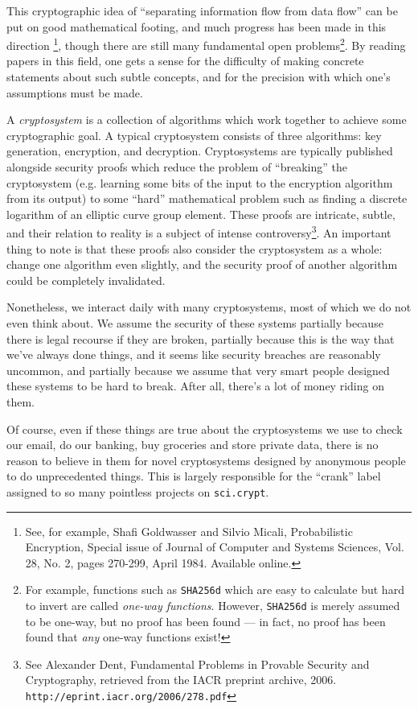 \documentclass[letterpaper]{article}
\begin{document}
This cryptographic idea of ``separating information flow from data flow''
can be put on good mathematical footing, and much progress has been made
in this direction \footnote{See, for example, Shafi Goldwasser and Silvio
Micali, Probabilistic Encryption, Special issue of Journal of Computer and
Systems Sciences, Vol. 28, No. 2, pages 270-299, April 1984. Available online.},
though there are still many fundamental open problems\footnote{For example,
functions such as \texttt{SHA256d} which are easy to calculate but hard to
invert are called \emph{one-way functions}. However, \texttt{SHA256d} is
merely assumed to be one-way, but no proof has been found --- in fact, no
proof has been found that \emph{any} one-way functions exist!}. By reading
papers in this field, one gets a sense for the difficulty of making
concrete statements about such subtle concepts, and for the precision
with which one's assumptions must be made.

A \emph{cryptosystem} is a collection of algorithms which work together
to achieve some cryptographic goal. A typical cryptosystem consists of
three algorithms: key generation, encryption, and decryption. Cryptosystems
are typically published alongside security proofs which reduce the problem
of ``breaking'' the cryptosystem (e.g. learning some bits of the input to
the encryption algorithm from its output) to some ``hard'' mathematical
problem such as finding a discrete logarithm of an elliptic curve group
element. These proofs are intricate, subtle, and their relation to reality
is a subject of intense controversy\footnote{See Alexander Dent, Fundamental
Problems in Provable Security and Cryptography, retrieved from the IACR
preprint archive, 2006. \texttt{http://eprint.iacr.org/2006/278.pdf}}. An
important thing to note is that these proofs also consider the cryptosystem
as a whole: change one algorithm even slightly, and the security proof of
another algorithm could be completely invalidated.

Nonetheless, we interact daily with many cryptosystems, most of which we
do not even think about. We assume the security of these systems partially
because there is legal recourse if they are broken, partially because this
is the way that we've always done things, and it seems like security breaches
are reasonably uncommon, and partially because we assume that very smart people
designed these systems to be hard to break. After all, there's a lot of money
riding on them.

Of course, even if these things are true about the cryptosystems we use to
check our email, do our banking, buy groceries and store private data, there
is no reason to believe in them for novel cryptosystems designed by anonymous
people to do unprecedented things. This is largely responsible for the ``crank''
label assigned to so many pointless projects on \texttt{sci.crypt}.
\end{document}
